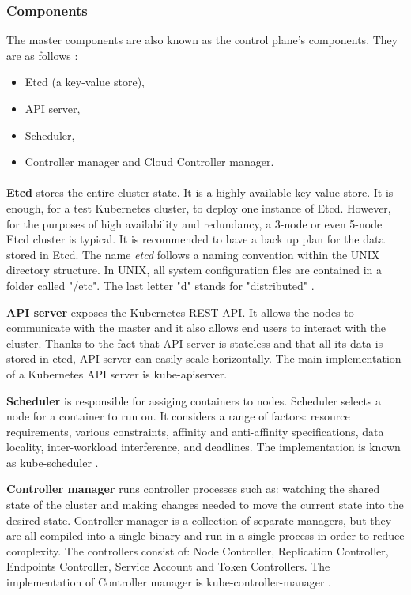 \subsubsection{Components}
The master components are also known as the control plane’s components. They are as follows \cite{book-mastering-k8s, k8s-components}:
\begin{itemize}
\item Etcd (a key-value store),
\item API server,
\item Scheduler,
\item Controller manager and Cloud Controller manager.
\end{itemize}

\paragraph{}
\textbf{Etcd} stores the entire cluster state. It is a highly-available key-value store. It is enough, for a test Kubernetes cluster, to deploy one instance of Etcd. However, for the purposes of high availability and redundancy, a 3-node or even 5-node Etcd cluster is typical. It is recommended to have a back up plan for the data stored in Etcd\cite{book-mastering-k8s,k8s-components}. The name \textit{etcd} follows a naming convention within the UNIX directory structure. In UNIX, all system configuration files are contained in a folder called "/etc". The last letter "d" stands for "distributed" \cite{etcd-name}.

\textbf{API server} exposes the Kubernetes REST API. It allows the nodes to communicate with the master and it also allows end users to interact with the cluster. Thanks to the fact that API server is stateless and that all its data is stored in etcd, API server can easily scale horizontally. The main implementation of a Kubernetes API server is kube-apiserver\cite{book-mastering-k8s,k8s-components,k8s-cluster}.


\textbf{Scheduler} is responsible for assiging containers to nodes. Scheduler selects a node for a container to run on. It considers a range of factors: resource requirements, various constraints, affinity and anti-affinity specifications, data locality, inter-workload interference, and deadlines. The implementation is known as kube-scheduler \cite{book-mastering-k8s, k8s-components}.

\textbf{Controller manager} runs controller processes such as: watching the shared state of the cluster and making changes needed to move the current state into the desired state. Controller manager is a collection of separate managers, but they are all compiled into a single binary and run in a single process in order to reduce complexity. The controllers consist of: Node Controller, Replication Controller, Endpoints Controller, Service Account and Token Controllers. The implementation of Controller manager is kube-controller-manager \cite{book-mastering-k8s, k8s-components}.

